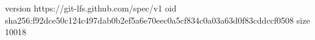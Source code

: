 version https://git-lfs.github.com/spec/v1
oid sha256:f92dce50c124c497dab0b2ef5a6e70eec0a5cf834c0a03a63d0f83cddccf0508
size 10018

